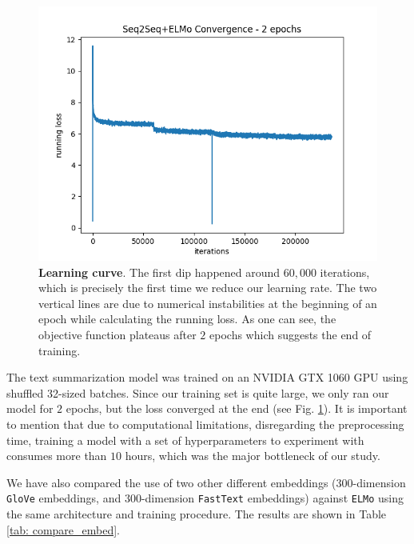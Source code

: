 \begin{figure}
\centering
\includegraphics[width=\linewidth]{figures/convergence.png}
\vspace{-8mm}
\caption{\textbf{Learning curve}. The first dip happened around $60,000$ iterations, which is precisely the first time we reduce our learning rate. The two vertical lines are due to numerical instabilities at the beginning of an epoch while calculating the running loss. As one can see, the objective function plateaus after $2$ epochs which suggests the end of training.}
\label{fig: convergence}
\end{figure}

The text summarization model was trained on an NVIDIA GTX 1060 GPU using shuffled 32-sized batches. Since our training set is quite large, we only ran our model for $2$ epochs, but the loss converged at the end (see Fig. \ref{fig: convergence}). It is important to mention that due to computational limitations, disregarding the preprocessing time, training a model with a set of hyperparameters to experiment with consumes more than $10$ hours, which was the major bottleneck of our study. 

We have also compared the use of two other different embeddings ($300$-dimension \texttt{GloVe} embeddings, and $300$-dimension \texttt{FastText} embeddings) against \texttt{ELMo} using the same architecture and training procedure. The results are shown in Table \ref{tab: compare_embed}.




